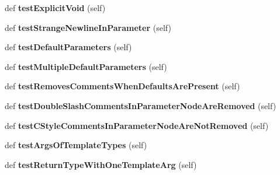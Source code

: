 \begin{DoxyCompactItemize}
def {\bfseries test\+Explicit\+Void} (self)
\item 
\mbox{\label{classcpp_1_1gmock__class__test_1_1GenerateMethodsTest_a184995b077a46f3408fa203cb0626614}} 
def {\bfseries test\+Strange\+Newline\+In\+Parameter} (self)
\item 
\mbox{\label{classcpp_1_1gmock__class__test_1_1GenerateMethodsTest_a61abb614ad02a1fef3ece3813695c22a}} 
def {\bfseries test\+Default\+Parameters} (self)
\item 
\mbox{\label{classcpp_1_1gmock__class__test_1_1GenerateMethodsTest_a41b91cc39a55385b8c4b97d804e80345}} 
def {\bfseries test\+Multiple\+Default\+Parameters} (self)
\item 
\mbox{\label{classcpp_1_1gmock__class__test_1_1GenerateMethodsTest_add445941c6503198f0c3a25e00d20b9f}} 
def {\bfseries test\+Removes\+Comments\+When\+Defaults\+Are\+Present} (self)
\item 
\mbox{\label{classcpp_1_1gmock__class__test_1_1GenerateMethodsTest_abb9fce46de4ac1d2943b85e84ce14c83}} 
def {\bfseries test\+Double\+Slash\+Comments\+In\+Parameter\+Node\+Are\+Removed} (self)
\item 
\mbox{\label{classcpp_1_1gmock__class__test_1_1GenerateMethodsTest_afa44c6ac675ce7454ff0f51164bde59e}} 
def {\bfseries test\+C\+Style\+Comments\+In\+Parameter\+Node\+Are\+Not\+Removed} (self)
\item 
\mbox{\label{classcpp_1_1gmock__class__test_1_1GenerateMethodsTest_ade05313ccffe74f9eaa42fb66c14f702}} 
def {\bfseries test\+Args\+Of\+Template\+Types} (self)
\item 
\mbox{\label{classcpp_1_1gmock__class__test_1_1GenerateMethodsTest_a747b7b1b9da071eb8e1e2b84c7ee3614}} 
def {\bfseries test\+Return\+Type\+With\+One\+Template\+Arg} (self)

\end{DoxyCompactItemize}
